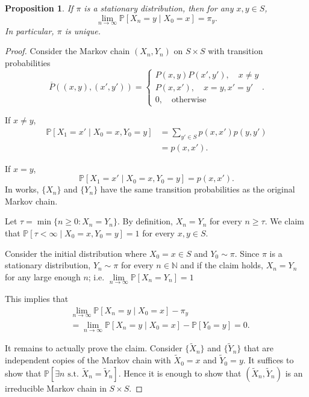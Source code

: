 \documentclass{tufte-handout}
\newcommand*\N{\mathbb{N}}
\renewcommand*\P{\mathbb{P}}
\newtheorem{prop}[thm]{Proposition}
\theoremstyle{definition}
\begin{document}
\begin{prop}
	If $\pi$ is a stationary distribution, then for any $x,y \in S$, \[
		\lim\limits_{n \to \infty} \P\left[X_n =y \mid X_0 = x\right] = \pi_y
	.\] In particular, $\pi$ is unique.
\end{prop}

\begin{proof}
	Consider the Markov chain $(X_n, Y_n)$ on $S \times S$ with transition probabilities \[
		\overline{P}\left( \left( x,y \right), \left( x',y' \right) \right) = \begin{cases}
			P(x,y) P(x',y'), \quad x \ne y \\
			P(x,x'), \quad x =y, x'=y' \\
			0, \quad \text{otherwise}
		\end{cases}
	.\] 

	If $x \ne y$, 
	\begin{align*}
		\P\left[X_1 = x' \mid X_0 = x, Y_0 = y\right] &= \sum\limits_{y' \in S}^{} p(x,x')p(y,y') \\
													  &= p(x,x')
	.\end{align*}

	If $x=y$, \[
		\P\left[X_1 = x' \mid X_0 = x, Y_0 = y\right] = p(x,x')
	.\] In works, $\{X_n\}$ and $\{Y_n\}$ have the same transition probabilities as the original Markov chain.

	Let $\tau = \min \{n \ge 0 : X_n = Y_n\}$. By definition, $X_n = Y_n$ for every $n \ge \tau$. We claim that $\P\left[\tau < \infty \mid X_0= x, Y_0 = y\right] = 1$ for every $x,y \in S$.

	Consider the initial distribution where $X_0 = x \in S$ and $Y_0 \sim \pi$. Since $\pi$ is a stationary distribution, $Y_n \sim \pi$ for every $n \in \N$ and if the claim holds, $X_n = Y_n$ for any large enough $n$; i.e. $\lim\limits_{n \to \infty} \P\left[X_n = Y_n \right] = 1$

	This implies that
	\begin{align*}
		&\lim\limits_{n \to \infty} \P\left[X_n = y \mid X_0 = x\right] - \pi_y \\
		&= \lim\limits_{n \to \infty} \P\left[X_n = y \mid X_0 = x\right]  - \P\left[Y_0 =y\right] = 0
	.\end{align*}
	
	It remains to actually prove the claim. Consider $\{\tilde{X}_n\}$ and $\{\tilde{Y}_n\}$ that are independent copies of the Markov chain with $\tilde{X}_0 = x$ and $\tilde{Y}_0 = y$. It suffices to show that $\P\left[\exists n \text{ s.t. } \tilde{X}_n = \tilde{Y}_n\right]$. Hence it is enough to show that $\left( \tilde{X}_n, \tilde{Y}_n \right)$ is an irreducible Markov chain in $S \times S$.


\end{proof}
\end{document}
